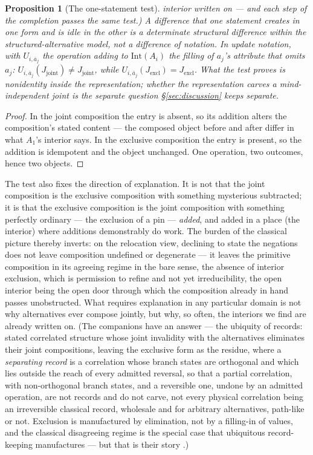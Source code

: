 \documentclass[11pt]{article}
\newtheorem{proposition}{Proposition}
\begin{document}
\begin{proposition}[The one-statement test]
interior written on --- and each step of the completion passes the same test.) A difference that one statement creates in one form and is idle in the other is a determinate structural difference within the structured-alternative model, not a difference of notation. In update notation, with $U_{i, \bar{a}_j}$ the operation adding to $\mathrm{Int}(A_i)$ the filling of $a_j$'s attribute that omits $a_j$: $U_{i,\bar{a}_j}(J_{\mathrm{joint}}) \ne J_{\mathrm{joint}}$, while $U_{i,\bar{a}_j}(J_{\mathrm{excl}}) = J_{\mathrm{excl}}$. What the test proves is nonidentity \emph{inside the representation}; whether the representation carves a mind-independent joint is the separate question \S\ref{sec:discussion} keeps separate.
\end{proposition}
\begin{proof}
In the joint composition the entry is absent, so its addition alters the composition's stated content --- the composed object before and after differ in what $A_1$'s interior says. In the exclusive composition the entry is present, so the addition is idempotent and the object unchanged. One operation, two outcomes, hence two objects.
\end{proof}
The test also fixes the direction of explanation. It is not that the joint composition is the exclusive composition with something mysterious subtracted; it is that the exclusive composition is the joint composition with something perfectly ordinary --- the exclusion of a pin --- \emph{added}, and added in a place (the interior) where additions demonstrably do work. The burden of the classical picture thereby inverts: on the relocation view, declining to state the negations does not leave composition undefined or degenerate --- it leaves the primitive composition in its agreeing regime in the bare sense, the absence of interior exclusion, which is permission to refine and not yet irreducibility, the open interior being the open door through which the composition already in hand passes unobstructed. What requires explanation in any particular domain is not why alternatives ever compose jointly, but why, so often, the interiors we find are already written on. (The companions have an answer --- the ubiquity of records: stated correlated structure whose joint invalidity with the alternatives eliminates their joint compositions, leaving the exclusive form as the residue, where a \emph{separating record} is a correlation whose branch states are orthogonal and which lies outside the reach of every admitted reversal, so that a partial correlation, with non-orthogonal branch states, and a reversible one, undone by an admitted operation, are not records and do not carve, not every physical correlation being an irreversible classical record, wholesale and for arbitrary alternatives, path-like or not. Exclusion is manufactured by elimination, not by a filling-in of values, and the classical disagreeing regime is the special case that ubiquitous record-keeping manufactures --- but that is their story \parencite{Aethus}.)
\end{document}
